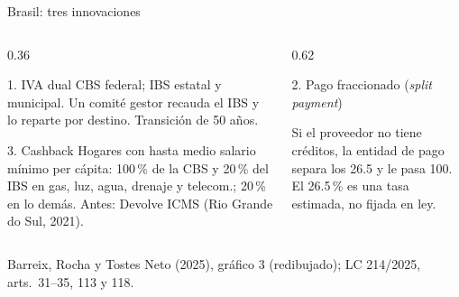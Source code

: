 \documentclass[aspectratio=169,11pt]{beamer}
\newcommand{\fuente}[1]{\par\vfill{\small\color{cGris}#1\par}}
\begin{document}
\begin{frame}{Brasil: tres innovaciones}
  \small
  \begin{columns}[T]
    \begin{column}{0.36\textwidth}
      \begin{block}{1. IVA dual}
        CBS federal; IBS estatal y municipal. Un comité gestor recauda el IBS y lo reparte por destino. Transición de 50 años.
      \end{block}
      \begin{block}{3. Cashback}
        Hogares con hasta medio salario mínimo per cápita: 100\,\% de la CBS y 20\,\% del IBS en gas, luz, agua, drenaje y telecom.; 20\,\% en lo demás. Antes: Devolve ICMS (Rio Grande do Sul, 2021).
      \end{block}
    \end{column}
    \begin{column}{0.62\textwidth}
      \begin{block}{2. Pago fraccionado (\emph{split payment})}
        \centering
        \par
        Si el proveedor no tiene créditos, la entidad de pago separa los 26.5 y le pasa 100. El 26.5\,\% es una tasa estimada, no fijada en ley.
      \end{block}
    \end{column}
  \end{columns}
  \fuente{Barreix, Rocha y Tostes Neto (2025), gráfico 3 (redibujado); LC 214/2025, arts.~31--35, 113 y 118.}
\end{frame}
\end{document}
